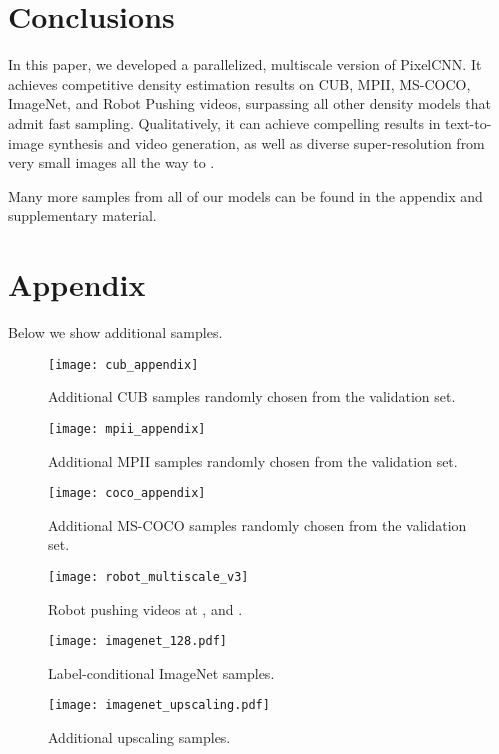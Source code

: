 \documentclass{article}
\begin{document}
\section{Conclusions}
In this paper, we developed a parallelized, multiscale version of PixelCNN.
It achieves competitive density estimation results on
CUB, MPII, MS-COCO, ImageNet, and Robot Pushing videos, surpassing all other density models that admit fast sampling.
Qualitatively, it can achieve compelling results in text-to-image synthesis and video generation, as well as diverse super-resolution from very small images all the way to .

Many more samples from all of our models can be found in the appendix and supplementary material.





\newpage
\newpage

\section{Appendix}
Below we show additional samples.

\begin{figure*}[h]
\centering
\texttt{[image: cub\_appendix]}
\vspace{-0.15in}
\caption{Additional CUB samples randomly chosen from the validation set.\label{fig:cub_appendix}}
\end{figure*}

\begin{figure*}[h]
\centering
\texttt{[image: mpii\_appendix]}
\vspace{-0.15in}
\caption{Additional MPII samples randomly chosen from the validation set.\label{fig:mpii_appendix}}
\end{figure*}

\begin{figure*}[h]
\centering
\texttt{[image: coco\_appendix]}
\vspace{-0.15in}
\caption{Additional MS-COCO samples randomly chosen from the validation set.\label{fig:coco_appendix}}
\end{figure*}

\begin{figure*}[h]
\centering
\texttt{[image: robot\_multiscale\_v3]}
\vspace{-0.15in}
\caption{Robot pushing videos at ,  and .\label{fig:robot}}
\end{figure*}

\begin{figure*}[h]
\centering
\texttt{[image: imagenet\_128.pdf]}
\vspace{-0.15in}
\caption{Label-conditional  ImageNet samples.\label{fig:imagenet_appendix}}
\end{figure*}

\begin{figure*}[h]
\centering
\texttt{[image: imagenet\_upscaling.pdf]}
\vspace{-0.15in}
\caption{Additional upscaling samples.\label{fig:imagenet_upscaling_appendix}}
\end{figure*}
\end{document}
